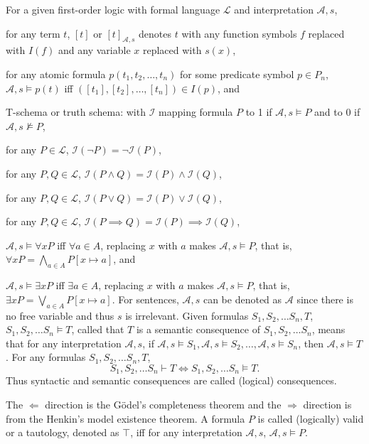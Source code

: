 \documentclass[a4paper,12pt]{article}
\begin{document}
For a given first-order logic with formal language $\mathcal{L}$ and interpretation $\mathcal{A},s$,
\bit
\item for any term $t$, $[t]$ or $[t]_{\mathcal{A},s}$ denotes $t$ with any function symbols $f$ replaced with $I(f)$ and any variable $x$ replaced with $s(x)$,
\item for any atomic formula $p(t_1,t_2,\ldots,t_n)$ for some predicate symbol $p\in P_n$, $\mathcal{A},s\vDash p(t)$ iff $([t_1],[t_2],\ldots,[t_n])\in I(p)$, and
\item T-schema or truth schema: with $\mathscr{I}$ mapping formula $P$ to 1 if $\mathcal{A},s\vDash P$ and to 0 if $\mathcal{A},s\nvDash P$,
\bit
\item for any $P\in\mathcal{L}$, $\mathscr{I}(\neg P)=\neg\mathscr{I}(P)$,
\item for any $P,Q\in\mathcal{L}$, $\mathscr{I}(P\land Q)=\mathscr{I}(P)\land\mathscr{I}(Q)$,
\item for any $P,Q\in\mathcal{L}$, $\mathscr{I}(P\lor Q)=\mathscr{I}(P)\lor\mathscr{I}(Q)$,
\item for any $P,Q\in\mathcal{L}$, $\mathscr{I}(P\implies Q)=\mathscr{I}(P)\implies\mathscr{I}(Q)$,
\item $\mathcal{A},s\vDash\forall xP$ iff $\forall a\in A$, replacing $x$ with $a$ makes $\mathcal{A},s\vDash P$, that is, $\forall xP=\bigwedge_{a\in A}P[x\mapsto a]$, and
\item $\mathcal{A},s\vDash\exists xP$ iff $\exists a\in A$, replacing $x$ with $a$ makes $\mathcal{A},s\vDash P$, that is, $\exists xP=\bigvee_{a\in A}P[x\mapsto a]$.
\eit
\eit
For sentences, $\mathcal{A},s$ can be denoted as $\mathcal{A}$ since there is no free variable and thus $s$ is irrelevant.
Given formulas $S_1,S_2,\ldots S_n,T$, $S_1,S_2,\ldots S_n\vDash T$, called that $T$ is a semantic consequence of $S_1,S_2,\ldots S_n$, means that for any interpretation $\mathcal{A},s$, if $\mathcal{A},s\vDash S_1,\mathcal{A},s\vDash S_2,\ldots,\mathcal{A},s\vDash S_n$, then $\mathcal{A},s\vDash T$.
For any formulas $S_1,S_2,\ldots S_n,T$,
\[S_1,S_2,\ldots S_n\vdash T\iff S_1,S_2,\ldots S_n\vDash T.\]
Thus syntactic and semantic consequences are called (logical) consequences.

The $\Leftarrow$ direction is the Gödel's completeness theorem and the $\Rightarrow$ direction is from the Henkin's model existence theorem.
A formula $P$ is called (logically) valid or a tautology, denoted as $\top$, iff for any interpretation $\mathcal{A},s$, $\mathcal{A},s\vDash P$.
\end{document}
